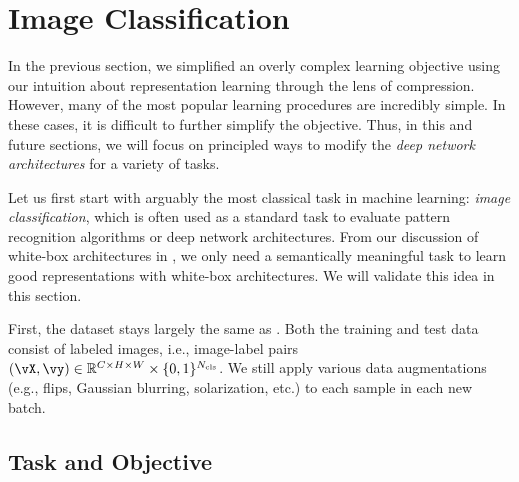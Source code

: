 \documentclass[../../book-main.tex]{subfiles}
\begin{document}
\section{Image Classification}\label{sec:image_classification}

In the previous section, we simplified an overly complex learning objective using our intuition about representation learning through the lens of compression. However, many of the most popular learning procedures are incredibly simple. In these cases, it is difficult to further simplify the objective. Thus, in this and future sections, we will focus on principled ways to modify the \textit{deep network architectures} for a variety of tasks.

Let us first start with arguably the most classical task in machine learning: \textit{image classification}, which is often used as a standard task to evaluate pattern recognition algorithms or deep network architectures. From our discussion of white-box architectures in , we only need a semantically meaningful task to learn good representations with white-box architectures. We will validate this idea in this section.

First, the dataset stays largely the same as . Both the training and test data consist of labeled images, i.e., image-label pairs \((\vX, \vy) \in \R^{C \times H \times W} \times \{0, 1\}^{N_{\cls}}\). We still apply various data augmentations (e.g., flips, Gaussian blurring, solarization, etc.) to each sample in each new batch. 

\subsection{Task and Objective} \label{sub:image_classification_objective}
\end{document}
